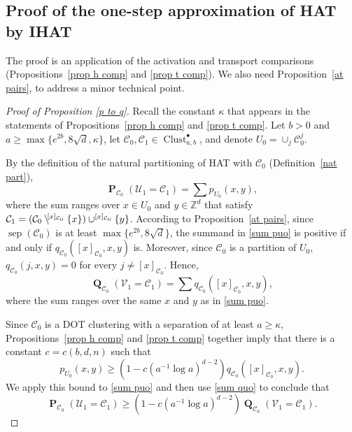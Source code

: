 \documentclass[11pt,reqno]{amsart}
\theoremstyle{definition}
\numberwithin{equation}{section}
\newcommand{\Z}{\mathbb{Z}}
\newcommand{\1}{\mathbf{1}}
\DeclareMathOperator{\PP}{\mathbf{P}}
\DeclareMathOperator{\QQ}{\mathbf{Q}}
\DeclareMathOperator{\sep}{sep}
\newcommand{\sd}[1]{\setminus^{\hspace{-0.2em} #1}}
\newcommand{\CC}{\mathcal{C}}
\newcommand{\UU}{\mathcal{U}}
\newcommand{\VV}{\mathcal{V}}
\DeclareMathOperator{\Clust}{\mathrm{Clust}}
\begin{document}
\subsection{Proof of the one-step approximation of HAT by IHAT}

The proof is an application of the activation and transport comparisons (Propositions~\ref{prop h comp} and \ref{prop t comp}). We also need Proposition~\ref{at pairs}, to address a minor technical point.

\begin{proof}[Proof of Proposition \ref{p to q}]
Recall the constant $\kappa$ that appears in the statements of Propositions~\ref{prop h comp} and \ref{prop t comp}. Let $b > 0$ and $a \geq \max \{e^{2b},8\sqrt{d}, \kappa\}$, let $\CC_0, \CC_1 \in \Clust_{a,b}^\bullet$, and denote $U_0 = \cup_j \CC_0^j$.

By the definition of the natural partitioning of HAT with $\CC_0$ (Definition~\ref{nat part}),
\begin{equation}\label{sum puo}
\PP_{\CC_0} (\UU_1 = \CC_1) = \sum p_{U_0} (x,y),
\end{equation}
where the sum ranges over $x \in U_0$ and $y \in \Z^d$ that satisfy $\CC_1 = (\CC_0 \sd{[x]_{\CC_0}} \{x\}) \cup^{[x]_{\CC_0}} \{y\}$. According to Proposition~\ref{at pairs}, since $\sep (\CC_0)$ is at least $\max \{e^{2b}, 8 \sqrt{d}\}$, the summand in \eqref{sum puo} is positive if and only if $q_{\CC_0} ([x]_{\CC_0},x,y)$ is. Moreover, since $\CC_0$ is a partition of $U_0$, $q_{\CC_0} (j,x,y) = 0$ for every $j \neq [x]_{\CC_0}$. Hence,
\begin{equation}\label{sum quo}
\QQ_{\CC_0} (\VV_1 = \CC_1) = \sum q_{\CC_0} ([x]_{\CC_0},x,y),
\end{equation}
where the sum ranges over the same $x$ and $y$ as in \eqref{sum puo}.

Since $\CC_0$ is a DOT clustering with a separation of at least $a \geq \kappa$, Propositions~\ref{prop h comp} and \ref{prop t comp} together imply that there is a constant $c = c (b,d,n)$ such that 
\begin{equation}\label{pq comp}
p_{U_0} (x,y) \geq \left(1 - c \left( a^{-1} \log a \right)^{d-2} \right) q_{\CC_0} ([x]_{\CC_0},x,y).
\end{equation}
 We apply this bound to \eqref{sum puo} and then use \eqref{sum quo} to conclude that
\[
\PP_{\CC_0} (\UU_1 = \CC_1) \geq \left(1 - c \left( a^{-1} \log a \right)^{d-2} \right) \QQ_{\CC_0} (\VV_1 = \CC_1).
\]
\end{proof}
\end{document}
